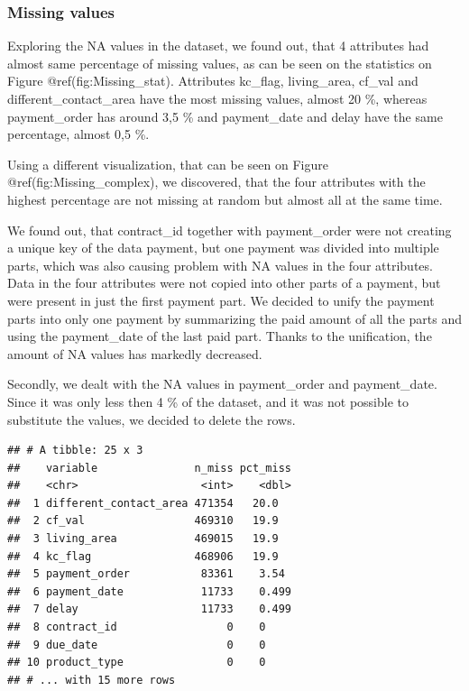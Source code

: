 \documentclass[
]{article}
\begin{document}
\hypertarget{missing-values}{%
\subsubsection{Missing values}\label{missing-values}}

Exploring the NA values in the dataset, we found out, that 4 attributes had
almost same percentage of missing values, as can be seen on the statistics on Figure @ref(fig:Missing\_stat).
Attributes kc\_flag, living\_area, cf\_val and different\_contact\_area have the most missing values, almost 20 \%, whereas payment\_order has around 3,5 \% and payment\_date and delay have the same percentage, almost 0,5 \%.

Using a different visualization, that can be seen on Figure @ref(fig:Missing\_complex),
we discovered, that the four attributes with the highest percentage are
not missing at random but almost all at the same time.

We found out, that contract\_id together with payment\_order were not creating a unique key of the data payment,
but one payment was divided into multiple parts, which was also causing problem with NA values in the four attributes. Data in the four attributes were not copied into other parts of a payment, but were present in just the first payment part.
We decided to unify the payment parts into only one payment by summarizing the
paid amount of all the parts and using the payment\_date of the last paid part.
Thanks to the unification, the amount of NA values has markedly decreased.

Secondly, we dealt with the NA values in payment\_order and payment\_date.
Since it was only less then 4 \% of the dataset, and it was not possible to
substitute the values, we decided to delete the rows.

\begin{verbatim}
## # A tibble: 25 x 3
##    variable               n_miss pct_miss
##    <chr>                   <int>    <dbl>
##  1 different_contact_area 471354   20.0  
##  2 cf_val                 469310   19.9  
##  3 living_area            469015   19.9  
##  4 kc_flag                468906   19.9  
##  5 payment_order           83361    3.54 
##  6 payment_date            11733    0.499
##  7 delay                   11733    0.499
##  8 contract_id                 0    0    
##  9 due_date                    0    0    
## 10 product_type                0    0    
## # ... with 15 more rows
\end{verbatim}
\end{document}
